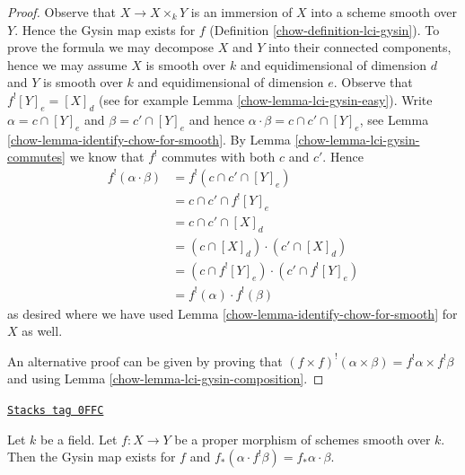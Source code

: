 \begin{proof}

Observe that $X \to X \times_k Y$ is an immersion of $X$ into a scheme
smooth over $Y$. Hence the Gysin map exists for $f$
(Definition \ref{chow-definition-lci-gysin}).
To prove the formula we may decompose $X$ and $Y$ into their
connected components, hence we may assume $X$ is smooth over $k$
and equidimensional of dimension $d$ and $Y$ is smooth over $k$
and equidimensional of dimension $e$. Observe that
$f^![Y]_e = [X]_d$ (see for example Lemma \ref{chow-lemma-lci-gysin-easy}).
Write $\alpha = c \cap [Y]_e$ and $\beta = c' \cap [Y]_e$
and hence $\alpha \cdot \beta = c \cap c' \cap [Y]_e$,
see Lemma \ref{chow-lemma-identify-chow-for-smooth}.
By Lemma \ref{chow-lemma-lci-gysin-commutes} we know that $f^!$
commutes with both $c$ and $c'$. Hence
\begin{align*}
f^!(\alpha \cdot \beta)
& =
f^!(c \cap c' \cap [Y]_e) \\
& =
c \cap c' \cap f^![Y]_e \\
& =
c \cap c' \cap [X]_d \\
& =
(c \cap [X]_d) \cdot (c' \cap [X]_d) \\
& =
(c \cap f^![Y]_e) \cdot (c' \cap f^![Y]_e) \\
& =
f^!(\alpha) \cdot f^!(\beta)
\end{align*}
as desired where we have used Lemma \ref{chow-lemma-identify-chow-for-smooth}
for $X$ as well.

\medskip\noindent
An alternative proof can be given by proving that
$(f \times f)^!(\alpha \times \beta) = f^!\alpha \times f^!\beta$
and using Lemma \ref{chow-lemma-lci-gysin-composition}.
\end{proof}

\begin{lemma}
\label{chow-lemma-projection-formula}
\href{https://stacks.math.columbia.edu/tag/0FFC}{\texttt{Stacks tag 0FFC}}

Let $k$ be a field. Let $f : X \to Y$ be a proper morphism of schemes smooth
over $k$. Then the Gysin map exists for $f$ and
$f_*(\alpha \cdot f^!\beta) = f_*\alpha \cdot \beta$.
\end{lemma}

